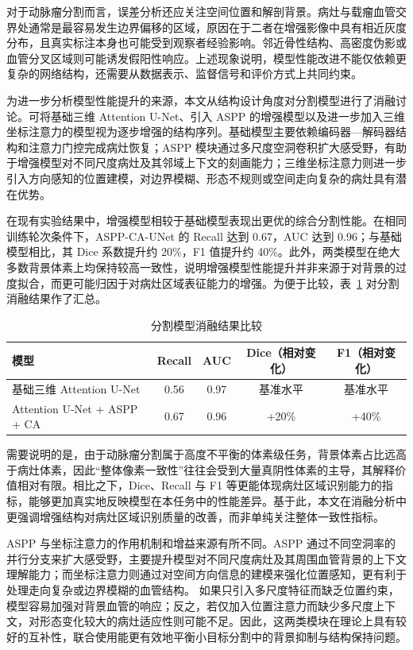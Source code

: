 对于动脉瘤分割而言，误差分析还应关注空间位置和解剖背景。病灶与载瘤血管交界处通常是最容易发生边界偏移的区域，原因在于二者在增强影像中具有相近灰度分布，且真实标注本身也可能受到观察者经验影响。邻近骨性结构、高密度伪影或血管分叉区域则可能诱发假阳性响应。上述现象说明，模型性能改进不能仅依赖更复杂的网络结构，还需要从数据表示、监督信号和评价方式上共同约束。

为进一步分析模型性能提升的来源，本文从结构设计角度对分割模型进行了消融讨论。可将基础三维 Attention U-Net、引入 ASPP 的增强模型以及进一步加入三维坐标注意力的模型视为逐步增强的结构序列。基础模型主要依赖编码器—解码器结构和注意力门控完成病灶恢复；ASPP 模块通过多尺度空洞卷积扩大感受野，有助于增强模型对不同尺度病灶及其邻域上下文的刻画能力；三维坐标注意力则进一步引入方向感知的位置建模，对边界模糊、形态不规则或空间走向复杂的病灶具有潜在优势。

在现有实验结果中，增强模型相较于基础模型表现出更优的综合分割性能。在相同训练轮次条件下，ASPP-CA-UNet 的 Recall 达到 0.67，AUC 达到 0.96；与基础模型相比，其 Dice 系数提升约 20\%，F1 值提升约 40\%。此外，两类模型在绝大多数背景体素上均保持较高一致性，说明增强模型性能提升并非来源于对背景的过度拟合，而更可能归因于对病灶区域表征能力的增强。为便于比较，表~\ref{tab:seg_ablation} 对分割消融结果作了汇总。

\begin{table}[htbp]
\centering
\caption{分割模型消融结果比较}
\label{tab:seg_ablation}
\small
\begin{tabular}{lcccc}
\toprule
模型 & Recall & AUC & Dice（相对变化） & F1（相对变化） \\
\midrule
基础三维 Attention U-Net & 0.56 & 0.97 & 基准水平 & 基准水平 \\
Attention U-Net + ASPP + CA & 0.67 & 0.96 & +20\% & +40\% \\
\bottomrule
\end{tabular}
\normalsize
\end{table}

需要说明的是，由于动脉瘤分割属于高度不平衡的体素级任务，背景体素占比远高于病灶体素，因此“整体像素一致性”往往会受到大量真阴性体素的主导，其解释价值相对有限。相比之下，Dice、Recall 与 F1 等更能体现病灶区域识别能力的指标，能够更加真实地反映模型在本任务中的性能差异。基于此，本文在消融分析中更强调增强结构对病灶区域识别质量的改善，而非单纯关注整体一致性指标。

ASPP 与坐标注意力的作用机制和增益来源有所不同。ASPP 通过不同空洞率的并行分支来扩大感受野，主要提升模型对不同尺度病灶及其周围血管背景的上下文理解能力；而坐标注意力则通过对空间方向信息的建模来强化位置感知，更有利于处理走向复杂或边界模糊的血管结构。
如果只引入多尺度特征而缺乏位置约束，模型容易加强对背景血管的响应；反之，若仅加入位置注意力而缺少多尺度上下文，对形态变化较大的病灶适应性则可能不足。因此，这两类模块在理论上具有较好的互补性，联合使用能更有效地平衡小目标分割中的背景抑制与结构保持问题。


